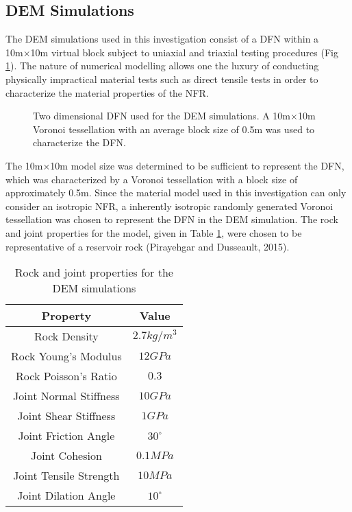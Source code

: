 \subsection{DEM Simulations}
The DEM simulations used in this investigation consist of a DFN within a 10m×10m virtual block subject to uniaxial and triaxial testing procedures (Fig \ref{fig:vorDFN}). The nature of numerical modelling allows one the luxury of conducting physically impractical material tests such as direct tensile tests in order to characterize the material properties of the NFR.

\begin{figure}[!htbp]
	\label{fig:vorDFN}
	\caption{Two dimensional DFN used for the DEM simulations. A 10m×10m Voronoi tessellation with an average block size of 0.5m was used to characterize the DFN.}
\end{figure}

The 10m×10m model size was determined to be sufficient to represent the DFN, which was characterized by a Voronoi tessellation with a block size of approximately 0.5m. Since the material model used in this investigation can only consider an isotropic NFR, a inherently isotropic randomly generated Voronoi tessellation was chosen to represent the DFN in the DEM simulation. The rock and joint properties for the model, given in Table \ref{tab:demProp}, were chosen to be representative of a reservoir rock (Pirayehgar and Dusseault, 2015).

\begin{table}[!htbp]
	\caption{Rock and joint properties for the DEM simulations}\label{tab:demProp}
    \begin{tabular}{c c}
		\hline
		Property				&	Value\\
		\hline
		Rock Density 			& 	$2.7 kg/m^3$\\
		Rock Young's Modulus	&	$12 GPa$\\
		Rock Poisson's Ratio	&	$0.3$\\
		Joint Normal Stiffness	&	$10 GPa$\\
		Joint Shear Stiffness	&	$1 GPa$\\
		Joint Friction Angle	&	$30^\circ$\\
		Joint Cohesion			&	$0.1 MPa$\\
		Joint Tensile Strength	&	$10 MPa$\\
		Joint Dilation Angle	&	$10^\circ$\\
		\hline
    \end{tabular}
\end{table}

